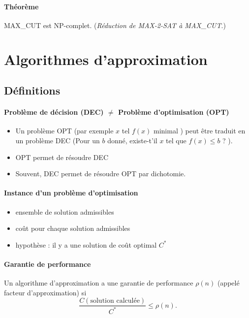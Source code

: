 \documentclass[french]{article}
\begin{document}
\paragraph{Théorème} MAX\_CUT est NP-complet. (\emph{Réduction de MAX-2-SAT à MAX\_CUT}.)

\section{Algorithmes d'approximation}

\subsection{Définitions}

\paragraph{Problème de décision (DEC) $≠$ Problème d’optimisation (OPT)} 
\begin{itemize}


\item Un problème OPT (par exemple \og $x$ tel $f(x)$ minimal \fg) peut être traduit en un problème DEC (\og Pour un $b$ donné, existe-t’il $x$ tel que $f(x) \leq b$ ? \fg). 

\item OPT permet de résoudre DEC
\item Souvent, DEC permet de résoudre OPT par dichotomie.

\end{itemize}

\paragraph{Instance d’un problème d’optimisation} 
\begin{itemize}
\item ensemble de solution admissibles
\item coût pour chaque solution admissibles
\item hypothèse : il y a une solution de coût optimal $C^*$
\end{itemize}

\paragraph{Garantie de performance} Un algorithme d’approximation a une garantie de performance $\rho (n)$ (appelé facteur d’approximation) si \[\dfrac{C(\text{solution calculée})}{C^*} \leq \rho(n).\]
\end{document}
